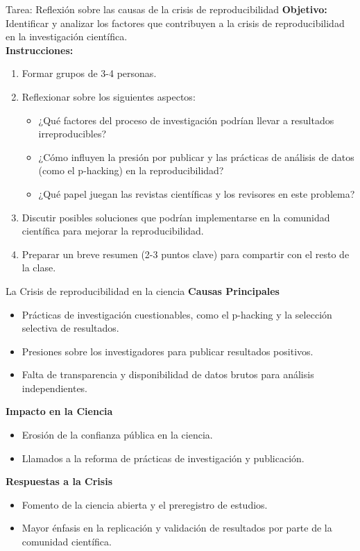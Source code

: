 ﻿\documentclass{beamer}
\begin{document}
\begin{frame}{Tarea: Reflexión sobre las causas de la crisis de reproducibilidad}
\textbf{Objetivo:} Identificar y analizar los factores que contribuyen a la crisis de reproducibilidad en la investigación científica.\\[10pt]
\textbf{Instrucciones:}
\begin{enumerate}
    \item Formar grupos de 3-4 personas.
    \item Reflexionar sobre los siguientes aspectos:
    \begin{itemize}
        \item ¿Qué factores del proceso de investigación podrían llevar a resultados irreproducibles?
        \item ¿Cómo influyen la presión por publicar y las prácticas de análisis de datos (como el p-hacking) en la reproducibilidad?
        \item ¿Qué papel juegan las revistas científicas y los revisores en este problema?
    \end{itemize}
    \item Discutir posibles soluciones que podrían implementarse en la comunidad científica para mejorar la reproducibilidad.
    \item Preparar un breve resumen (2-3 puntos clave) para compartir con el resto de la clase.
\end{enumerate}
\end{frame}


\begin{frame}{La Crisis de reproducibilidad en la ciencia}
\textbf{Causas Principales}
\begin{itemize}
    \item Prácticas de investigación cuestionables, como el p-hacking y la selección selectiva de resultados.
    \item Presiones sobre los investigadores para publicar resultados positivos.
    \item Falta de transparencia y disponibilidad de datos brutos para análisis independientes.
\end{itemize}

\textbf{Impacto en la Ciencia}
\begin{itemize}
    \item Erosión de la confianza pública en la ciencia.
    \item Llamados a la reforma de prácticas de investigación y publicación.
\end{itemize}

\textbf{Respuestas a la Crisis}
\begin{itemize}
    \item Fomento de la ciencia abierta y el preregistro de estudios.
    \item Mayor énfasis en la replicación y validación de resultados por parte de la comunidad científica.
\end{itemize}
\end{frame}
\end{document}
